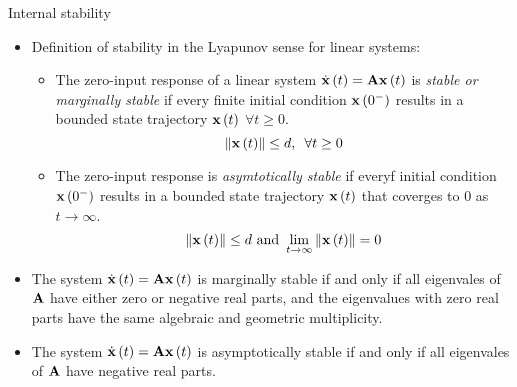 \documentclass[aspectratio=169]{beamer}
\def\mf{\ensuremath\mathbf}
\def\lp{\ensuremath\left(}
\def\rp{\ensuremath\right)}
\def\lV{\ensuremath\left\lVert}
\def\rV{\ensuremath\right\rVert}
\newcommand{\ct}[1]{\lp #1\rp}
\begin{document}
\begin{frame}{Internal stability}
\begin{itemize}
    \item Definition of stability in the Lyapunov sense for linear systems: 
    \begin{itemize}
      \item The zero-input response of a linear system $\dot{\mf{x}}\ct{t} = \mf{A}\mf{x}\ct{t}$ is \textit{stable or marginally stable} if every finite initial condition $\mf{x}\ct{0^-}$ results in a bounded state trajectory $\mf{x}\ct{t}$ $\forall t \geq 0$.
      \[ \lV \mf{x}\ct{t}\rV \leq d, \,\,\, \forall t \geq 0 \]

      \item The zero-input response is \textit{asymtotically stable} if everyf initial condition $\mf{x}\ct{0^-}$ results in a bounded state trajectory $\mf{x}\ct{t}$ that coverges to $0$ as $t \to \infty$.
      \[ \lV \mf{x}\ct{t}\rV \leq d \text{ and } \lim_{t \to \infty} \lV \mf{x}\ct{t}\rV = 0 \]
    \end{itemize}

    \item The system $\dot{\mf{x}}\ct{t} = \mf{A}\mf{x}\ct{t}$ is marginally stable if and only if all eigenvales of $\mf{A}$ have either zero or negative real parts, and the eigenvalues with zero real parts have the same algebraic and geometric multiplicity.

    \item  The system $\dot{\mf{x}}\ct{t} = \mf{A}\mf{x}\ct{t}$ is asymptotically stable if and only if all eigenvales of $\mf{A}$ have  negative real parts.
\end{itemize}
\end{frame}
\end{document}
